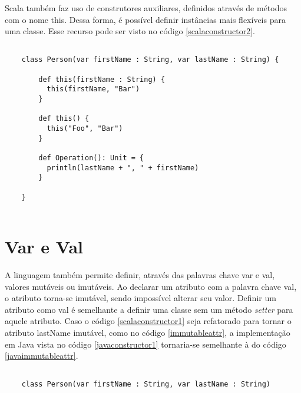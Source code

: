 Scala também faz uso de construtores auxiliares, definidos 
através de métodos com o nome this\cite{wampler2021}. 
Dessa forma, é possível 
definir instâncias mais flexíveis para uma classe. Esse 
recurso pode ser visto no código \ref{scalaconstructor2}.

\begin{lstlisting}[caption={Construtor Auxiliar em Scala},label=scalaconstructor2]

    class Person(var firstName : String, var lastName : String) {
       
        def this(firstName : String) {
          this(firstName, "Bar")
        }
    
        def this() {
          this("Foo", "Bar")
        }
      
        def Operation(): Unit = {
          println(lastName + ", " + firstName)
        }
  
    }
  
\end{lstlisting}



\section{Var e Val}

A linguagem também permite definir, através das 
palavras chave var e val, valores 
mutáveis ou imutáveis. Ao declarar um atributo com 
a palavra chave val, o atributo torna-se imutável, 
sendo impossível alterar seu valor.\cite{wampler2021, ordesky2008} 
Definir um atributo 
como val é semelhante a definir uma classe sem um 
método \textit{setter} para aquele atributo. Caso 
o código \ref{scalaconstructor1} seja refatorado 
para tornar o atributo lastName imutável, como no código 
\ref{immutableattr}, a implementação em Java vista no 
código \ref{javaconstructor1} tornaria-se semelhante à do código 
\ref{javaimmutableattr}.

\begin{lstlisting}[caption={Exemplo de Atributo Imutável},label=immutableattr]

    class Person(var firstName : String, var lastName : String)

\end{lstlisting}

